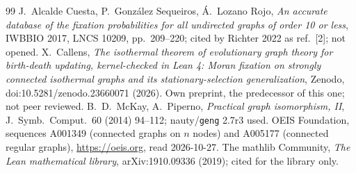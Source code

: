 \documentclass[10pt]{article}
\begin{document}
\begin{thebibliography}{99}
 J.~Alcalde Cuesta, P.~Gonz\'alez Sequeiros, \'A.~Lozano Rojo, \emph{An accurate database of the fixation probabilities for all undirected graphs of order 10 or less}, IWBBIO 2017, LNCS 10209, pp.~209--220; cited by Richter 2022 as ref.~[2]; not opened.
 X.~Callens, \emph{The isothermal theorem of evolutionary graph theory for birth-death updating, kernel-checked in Lean 4: Moran fixation on strongly connected isothermal graphs and its stationary-selection generalization}, Zenodo, doi:10.5281/zenodo.23660071 (2026). Own preprint, the predecessor of this one; not peer reviewed.
 B.~D.~McKay, A.~Piperno, \emph{Practical graph isomorphism, II}, J.\ Symb.\ Comput.\ 60 (2014) 94--112; nauty/\texttt{geng} 2.7r3 used.
 OEIS Foundation, sequences A001349 (connected graphs on $n$ nodes) and A005177 (connected regular graphs), \url{https://oeis.org}, read 2026-10-27.
 The mathlib Community, \emph{The Lean mathematical library}, arXiv:1910.09336 (2019); cited for the library only.
\end{thebibliography}
\end{document}
